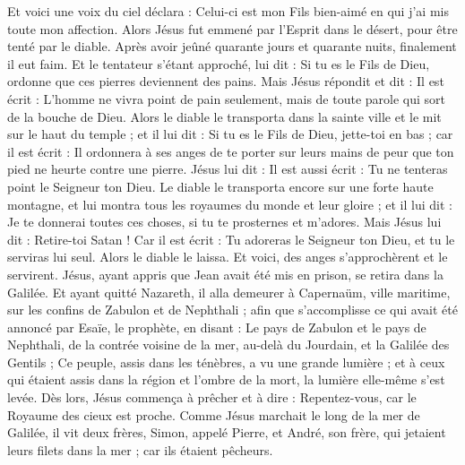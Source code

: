 \begin{multicols}{2}
Et voici une voix du ciel déclara : Celui-ci est mon Fils bien-aimé en qui j'ai mis toute mon affection.
\VerseOne{}Alors Jésus fut emmené par l'Esprit dans le désert, pour être tenté par le diable.
Après avoir jeûné quarante jours et quarante nuits, finalement il eut faim.
Et le tentateur s'étant approché, lui dit : Si tu es le Fils de Dieu, ordonne que ces pierres deviennent des pains.
Mais Jésus répondit et dit : Il est écrit : L'homme ne vivra point de pain seulement, mais de toute parole qui sort de la bouche de Dieu.
Alors le diable le transporta dans la sainte ville et le mit sur le haut du temple ;
et il lui dit : Si tu es le Fils de Dieu, jette-toi en bas ; car il est écrit : Il ordonnera à ses anges de te porter sur leurs mains de peur que ton pied ne heurte contre une pierre.
Jésus lui dit : Il est aussi écrit : Tu ne tenteras point le Seigneur ton Dieu.
Le diable le transporta encore sur une forte haute montagne, et lui montra tous les royaumes du monde et leur gloire ;
et il lui dit : Je te donnerai toutes ces choses, si tu te prosternes et m'adores.
Mais Jésus lui dit : Retire-toi Satan ! Car il est écrit : Tu adoreras le Seigneur ton Dieu, et tu le serviras lui seul.
Alors le diable le laissa. Et voici, des anges s'approchèrent et le servirent.
Jésus, ayant appris que Jean avait été mis en prison, se retira dans la Galilée.
Et ayant quitté Nazareth, il alla demeurer à Capernaüm, ville maritime, sur les confins de Zabulon et de Nephthali ;
afin que s'accomplisse ce qui avait été annoncé par Esaïe, le prophète, en disant :
Le pays de Zabulon et le pays de Nephthali, de la contrée voisine de la mer, au-delà du Jourdain, et la Galilée des Gentils ;
Ce peuple, assis dans les ténèbres, a vu une grande lumière ; et à ceux qui étaient assis dans la région et l'ombre de la mort, la lumière elle-même s'est levée.
Dès lors, Jésus commença à prêcher et à dire : Repentez-vous, car le Royaume des cieux est proche.
Comme Jésus marchait le long de la mer de Galilée, il vit deux frères, Simon, appelé Pierre, et André, son frère, qui jetaient leurs filets dans la mer ; car ils étaient pêcheurs.

\end{multicols}
